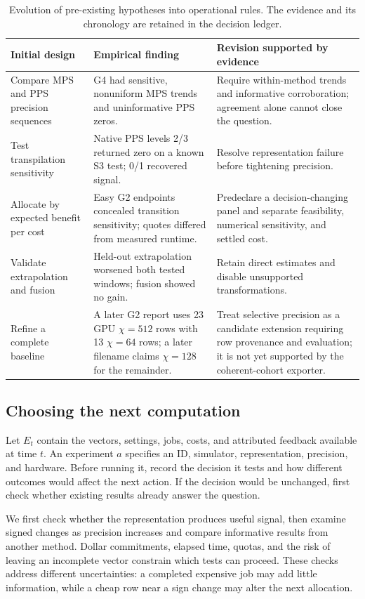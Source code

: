 \documentclass[11pt]{article}
\begin{document}
\begin{table}[h!]
\small
\begin{tabularx}{\textwidth}{@{}L{1.35in}XX@{}}
\toprule
Initial design & Empirical finding & Revision supported by evidence \\
\midrule
Compare MPS and PPS precision sequences & G4 had sensitive, nonuniform MPS trends and uninformative PPS zeros. & Require within-method trends and informative corroboration; agreement alone cannot close the question. \\
Test transpilation sensitivity & Native PPS levels 2/3 returned zero on a known S3 test; 0/1 recovered signal. & Resolve representation failure before tightening precision. \\
Allocate by expected benefit per cost & Easy G2 endpoints concealed transition sensitivity; quotes differed from measured runtime. & Predeclare a decision-changing panel and separate feasibility, numerical sensitivity, and settled cost. \\
Validate extrapolation and fusion & Held-out extrapolation worsened both tested windows; fusion showed no gain. & Retain direct estimates and disable unsupported transformations. \\
Refine a complete baseline & A later G2 report uses 23 GPU $\chi=512$ rows with 13 $\chi=64$ rows; a later filename claims $\chi=128$ for the remainder. & Treat selective precision as a candidate extension requiring row provenance and evaluation; it is not yet supported by the coherent-cohort exporter. \\
\bottomrule
\end{tabularx}
\caption{Evolution of pre-existing hypotheses into operational rules. The evidence and its chronology are retained in the decision ledger.}
\label{tab:evolution}
\end{table}

\subsection{Choosing the next computation}
Let $E_t$ contain the vectors, settings, jobs, costs, and attributed feedback available at time $t$. An experiment $a$ specifies an ID, simulator, representation, precision, and hardware. Before running it, record the decision it tests and how different outcomes would affect the next action. If the decision would be unchanged, first check whether existing results already answer the question.

We first check whether the representation produces useful signal, then examine signed changes as precision increases and compare informative results from another method. Dollar commitments, elapsed time, quotas, and the risk of leaving an incomplete vector constrain which tests can proceed. These checks address different uncertainties: a completed expensive job may add little information, while a cheap row near a sign change may alter the next allocation.
\end{document}
